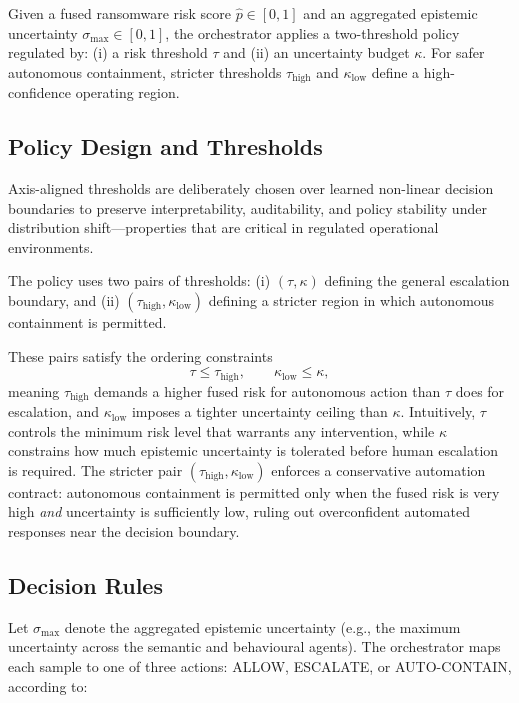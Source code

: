 \documentclass[lettersize,journal]{IEEEtran}
\begin{document}
Given a fused ransomware risk score $\hat{p} \in [0,1]$ and an aggregated epistemic
uncertainty $\sigma_{\max} \in [0,1]$, the orchestrator applies a two-threshold
policy regulated by: (i) a risk threshold $\tau$ and (ii) an uncertainty budget
$\kappa$. For safer autonomous containment, stricter thresholds
$\tau_{\text{high}}$ and $\kappa_{\text{low}}$ define a high-confidence operating
region.


\subsection{Policy Design and Thresholds}
\label{subsec:policy_thresholds}
Axis-aligned thresholds are deliberately chosen over learned non-linear decision boundaries to preserve interpretability, auditability, and policy stability under distribution shift—properties that are critical in regulated operational environments.

The policy uses two pairs of thresholds:
(i) $(\tau,\kappa)$ defining the general escalation boundary, and
(ii) $(\tau_{\text{high}},\kappa_{\text{low}})$ defining a stricter region in which
autonomous containment is permitted.

\cbstart
These pairs satisfy the ordering constraints
\begin{equation}
\tau \le \tau_{\text{high}}, \qquad \kappa_{\text{low}} \le \kappa,
\label{eq:threshold_order}
\end{equation}
meaning $\tau_{\text{high}}$ demands a higher fused risk for autonomous action than $\tau$
does for escalation, and $\kappa_{\text{low}}$ imposes a tighter uncertainty ceiling than
$\kappa$. Intuitively, $\tau$ controls the minimum risk level that warrants any intervention,
while $\kappa$ constrains how much epistemic uncertainty is tolerated before human escalation
is required. The stricter pair $(\tau_{\text{high}},\kappa_{\text{low}})$ enforces a
conservative automation contract: autonomous containment is permitted only when the fused
risk is very high \emph{and} uncertainty is sufficiently low, ruling out overconfident
automated responses near the decision boundary.
\cbend


\subsection{Decision Rules}
\label{subsec:policy_rules}

Let $\sigma_{\max}$ denote the aggregated epistemic uncertainty (e.g., the maximum
uncertainty across the semantic and behavioural agents). The orchestrator maps each
sample to one of three actions: \textsc{ALLOW}, \textsc{ESCALATE}, or
\textsc{AUTO-CONTAIN}, according to:
\end{document}
